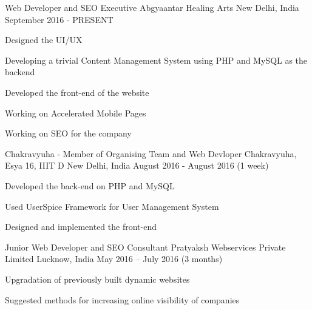 \begin{cventries}
  \cventry
    {Web Developer and SEO Executive}
    {Abgyaantar Healing Arts}
    {New Delhi, India}
    {September 2016 - PRESENT}
    {
      \begin{cvitems}
        \item {Designed the UI/UX }
        \item {Developing a trivial Content Management System using PHP and MySQL as the backend}
        \item {Developed the front-end of the website}
        \item{Working on Accelerated Mobile Pages}
        \item{Working on SEO for the company}
      \end{cvitems}
    }
  \cventry
    {Chakravyuha - Member of Organising Team and Web Devloper }
    {Chakravyuha, Esya 16, IIIT D}
    {New Delhi, India}
    {August 2016 - August 2016 (1 week)}
    {
      \begin{cvitems}
        \item {Developed the back-end on PHP and MySQL}
        \item {Used UserSpice Framework for User Management System}
        \item{Designed and implemented the front-end}
      \end{cvitems}
    }
  \cventry
    {Junior Web Developer and SEO Consultant}
    {Pratyaksh Webservices Private Limited}
    {Lucknow, India}
    {May 2016 – July 2016 (3 months)}
    {
      \begin{cvitems}
        \item {Upgradation of previously built dynamic websites}
        \item {Suggested methods for increasing online visibility of companies}
      \end{cvitems} 
    }
  
\end{cventries}
